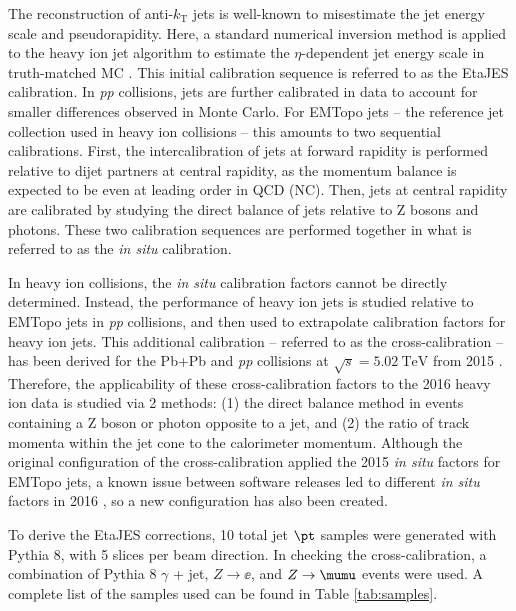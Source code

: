 \documentclass[NOTE, atlasdraft=true, texlive=2016, USenglish]{\ATLASLATEXPATH atlasdoc}
\begin{document}
The reconstruction of anti-$k_{\text{T}}$ jets is well-known to misestimate the jet energy scale and pseudorapidity. Here, a standard numerical inversion method is applied to the heavy ion jet algorithm to estimate the $\eta$-dependent jet energy scale in truth-matched MC \cite{ATL-COM-PHYS-2014-795}. This initial calibration sequence is referred to as the EtaJES calibration. In \textit{pp} collisions, jets are further calibrated in data to account for smaller differences observed in Monte Carlo. For EMTopo jets --  the reference jet collection used in heavy ion collisions -- this amounts to two sequential calibrations. First, the intercalibration of jets at forward rapidity is performed relative to dijet partners at central rapidity, as the momentum balance is expected to be even at leading order in QCD (NC). Then, jets at central rapidity are calibrated by studying the direct balance of jets relative to Z bosons and photons. These two calibration sequences are performed together in what is referred to as the \textit{in situ} calibration.\par

In heavy ion collisions, the \textit{in situ} calibration factors cannot be directly determined. Instead, the performance of heavy ion jets is studied relative to EMTopo jets in \textit{pp} collisions, and then used to extrapolate calibration factors for heavy ion jets. This additional calibration -- referred to as the cross-calibration \cite{ATLAS-CONF-2015-017} -- has been derived for the Pb+Pb and \textit{pp} collisions at $\sqrt{s}=\SI{5.02}{\TeV}$ from 2015 \cite{ATL-COM-PHYS-2016-1253}. Therefore, the applicability of these cross-calibration factors to the 2016 heavy ion data is studied via 2 methods: (1) the direct balance method in events containing a Z boson or photon opposite to a jet, and (2) the ratio of track momenta within the jet cone to the calorimeter momentum. Although the original configuration of the cross-calibration applied the 2015 \textit{in situ} factors for EMTopo jets, a known issue between software releases led to different \textit{in situ} factors in 2016 \cite{ATLAS-CONF-2015-017}, so a new configuration has also been created.\par

To derive the EtaJES corrections, 10 total jet $\pt$ samples were generated with Pythia 8, with 5 slices per beam direction. In checking the cross-calibration, a combination of Pythia 8 $\gamma$ + jet, $Z\rightarrow\ee$, and $Z\rightarrow\mumu$ events were used. A complete list of the samples used can be found in Table \ref{tab:samples}.
\end{document}
